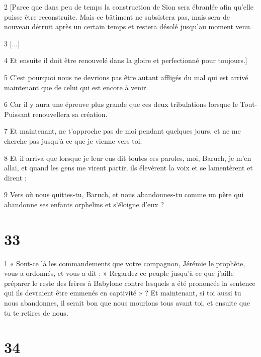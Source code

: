 \par 2 [Parce que dans peu de temps la construction de Sion sera ébranlée afin qu'elle puisse être reconstruite. Mais ce bâtiment ne subsistera pas, mais sera de nouveau détruit après un certain temps et restera désolé jusqu'au moment venu.

\par 3 [...]

\par 4 Et ensuite il doit être renouvelé dans la gloire et perfectionné pour toujours.]

\par 5 C'est pourquoi nous ne devrions pas être autant affligés du mal qui est arrivé maintenant que de celui qui est encore à venir.

\par 6 Car il y aura une épreuve plus grande que ces deux tribulations lorsque le Tout-Puissant renouvellera sa création.

\par 7 Et maintenant, ne t'approche pas de moi pendant quelques jours, et ne me cherche pas jusqu'à ce que je vienne vers toi.

\par 8 Et il arriva que lorsque je leur eus dit toutes ces paroles, moi, Baruch, je m'en allai, et quand les gens me virent partir, ils élevèrent la voix et se lamentèrent et dirent :

\par 9 Vers où nous quittes-tu, Baruch, et nous abandonnes-tu comme un père qui abandonne ses enfants orphelins et s'éloigne d'eux ?

\chapter{33}

\par 1 « Sont-ce là les commandements que votre compagnon, Jérémie le prophète, vous a ordonnés, et vous a dit : » Regardez ce peuple jusqu'à ce que j'aille préparer le reste des frères à Babylone contre lesquels a été prononcée la sentence qui ils devraient être emmenés en captivité » ? Et maintenant, si toi aussi tu nous abandonnes, il serait bon que nous mourions tous avant toi, et ensuite que tu te retires de nous.

\chapter{34}

